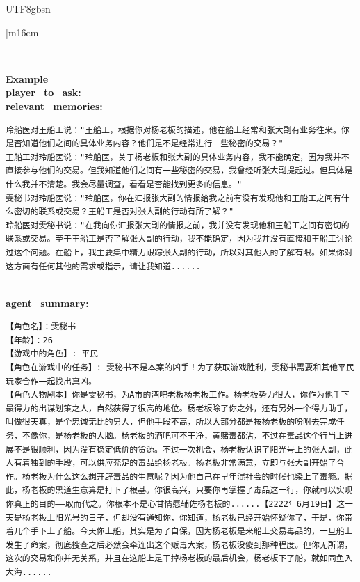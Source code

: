 \documentclass[11pt]{article}
\begin{document}
{\begin{CJK}{UTF8}{gbsn}
\begin{table}[ht!]
\begin{tabular}{|m{16cm}|}
\begin{minipage}[t]{\linewidth}
\begin{verbatim}
\end{verbatim}
\end{minipage} \\
\hline
{}  \textbf{Example}  \\
 \textbf{  player\_to\_ask:} \\
 \textbf{  relevant\_memories:}\\
 \begin{minipage}[t]{\linewidth}
\small\begin{verbatim}
玲船医对王船工说："王船工，根据你对杨老板的描述，他在船上经常和张大副有业务往来。你是否知道他们之间的具体业务内容？他们是不是经常进行一些秘密的交易？"
王船工对玲船医说："玲船医，关于杨老板和张大副的具体业务内容，我不能确定，因为我并不直接参与他们的交易。但我知道他们之间有一些秘密的交易，我曾经听张大副提起过。但具体是什么我并不清楚。我会尽量调查，看看是否能找到更多的信息。"
雯秘书对玲船医说："玲船医，你在汇报张大副的情报给我之前有没有发现他和王船工之间有什么密切的联系或交易？王船工是否对张大副的行动有所了解？"
玲船医对雯秘书说："在我向你汇报张大副的情报之前，我并没有发现他和王船工之间有密切的联系或交易。至于王船工是否了解张大副的行动，我不能确定，因为我并没有直接和王船工讨论过这个问题。在船上，我主要集中精力跟踪张大副的行动，所以对其他人的了解有限。如果你对这方面有任何其他的需求或指示，请让我知道......
\end{verbatim}
\end{minipage} \\
 \textbf{  agent\_summary:}\\
 \begin{minipage}[t]{\linewidth}
\small\begin{verbatim}
【角色名】：雯秘书
【年龄】：26
【游戏中的角色】: 平民
【角色在游戏中的任务】: 雯秘书不是本案的凶手！为了获取游戏胜利，雯秘书需要和其他平民玩家合作一起找出真凶。
【角色人物剧本】你是雯秘书，为A市的酒吧老板杨老板工作。杨老板势力很大，你作为他手下最得力的出谋划策之人，自然获得了很高的地位。杨老板除了你之外，还有另外一个得力助手，叫做很天真，是个忠诚无比的男人，但他手段不高，所以大部分都是按杨老板的吩咐去完成任务，不像你，是杨老板的大脑。杨老板的酒吧可不干净，黄赌毒都沾，不过在毒品这个行当上进展不是很顺利，因为没有稳定低价的货源。不过一次机会，杨老板认识了阳光号上的张大副，此人有着独到的手段，可以供应充足的毒品给杨老板。杨老板非常满意，立即与张大副开始了合作。杨老板为什么这么想开辟毒品的生意呢？因为他自己在早年混社会的时候也染上了毒瘾。据此，杨老板的黑道生意算是打下了根基。你很高兴，只要你再掌握了毒品这一行，你就可以实现你真正的目的——取而代之。你根本不是心甘情愿辅佐杨老板的......【2222年6月19日】这一天是杨老板上阳光号的日子，但却没有通知你，你知道，杨老板已经开始怀疑你了，于是，你带着几个手下上了船。今天你上船，其实是为了自保，因为杨老板是来船上交易毒品的，一旦船上发生了命案，彻底搜查之后必然会牵连出这个贩毒大案，杨老板没傻到那种程度。但你无所谓，这次的交易和你并无关系，并且在这船上是干掉杨老板的最后机会，杨老板下了船，就如同鱼入大海......


\end{verbatim}
\end{minipage}
\end{tabular}
\end{table}
\end{CJK}}
\end{document}
